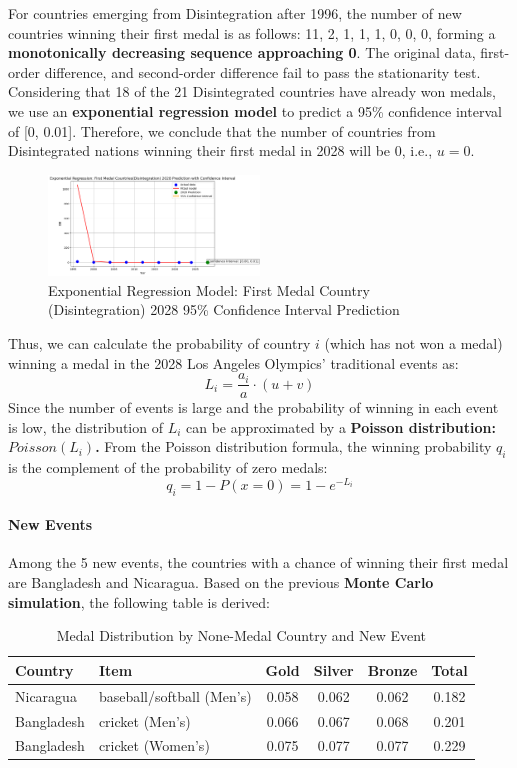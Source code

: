 \documentclass{mcmthesis}  %
\begin{document}
For countries emerging from Disintegration after 1996, the number of new countries winning their first medal is as follows: 11, 2, 1, 1, 1, 0, 0, 0, forming a \textbf{monotonically decreasing sequence approaching 0}. The original data, first-order difference, and second-order difference fail to pass the stationarity test. Considering that 18 of the 21 Disintegrated countries have already won medals, we use an \textbf{exponential regression model} to predict a 95\% confidence interval of [0, 0.01]. Therefore, we conclude that the number of countries from Disintegrated nations winning their first medal in 2028 will be 0, i.e., $u = 0$.

\begin{figure}[H]
  \centering
  \includegraphics[width=0.5\textwidth]{first_medal/jieti}
  \caption{Exponential Regression Model: First Medal Country (Disintegration) 2028 95\% Confidence Interval Prediction}
  \label{fig:sample-image}
\end{figure}

Thus, we can calculate the probability of country $i$ (which has not won a medal) winning a medal in the 2028 Los Angeles Olympics’ traditional events as: 
\[
L_i = \frac{a_i}{a} \cdot (u + v)
\]
Since the number of events is large and the probability of winning in each event is low, the distribution of $L_i$ can be approximated by a \textbf{Poisson distribution: $Poisson(L_i)$.} From the Poisson distribution formula, the winning probability $q_i$ is the complement of the probability of zero medals:
\[
q_i = 1 - P(x = 0) = 1 - e^{-L_i}
\]


\paragraph{New Events}
Among the 5 new events, the countries with a chance of winning their first medal are Bangladesh and Nicaragua. Based on the previous \textbf{Monte Carlo simulation}, the following table is derived:

\begin{table}[H]
\centering
\begin{tabular}{|l|l|c|c|c|c|}
\hline
\textbf{Country} & \textbf{Item} & \textbf{Gold} & \textbf{Silver} & \textbf{Bronze} & \textbf{Total} \\ \hline
Nicaragua        & baseball/softball (Men's) & 0.058 & 0.062 & 0.062 & 0.182 \\ \hline
Bangladesh       & cricket (Men's)           & 0.066 & 0.067 & 0.068 & 0.201 \\ \hline
Bangladesh       & cricket (Women's)         & 0.075 & 0.077 & 0.077 & 0.229 \\ \hline
\end{tabular}
\caption{Medal Distribution by None-Medal Country and New Event}
\end{table}
\end{document}
